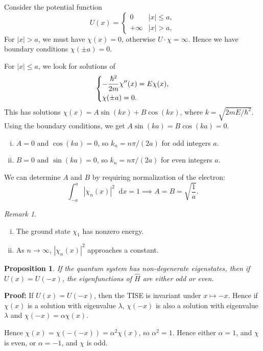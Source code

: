 \documentclass[12pt]{article}
\newcommand{\diff}{\mathop{}\!\mathrm{d}}
\newtheorem{proposition}{Proposition}[section]
\theoremstyle{definition}
\theoremstyle{remark}
\newtheorem*{remark}{Remark}
\begin{document}
Consider the potential function
\[
	U(x) =
	\begin{cases}
		0 & |x| \leq a, \\
		+\infty & |x| > a,
	\end{cases}
\]
For $|x| > a$, we must have $\chi(x) = 0$, otherwise $U \cdot \chi = \infty$. Hence we have boundary conditions $\chi(\pm a) = 0$.

For $|x| \leq a$, we look for solutions of
\[
\begin{dcases}
	- \frac{\hbar^2}{2m} \chi''(x) = E \chi(x), \\
	\chi(\pm a) = 0.
\end{dcases}
\]
This has solutions $\chi(x) = A \sin (k x) + B \cos (k x)$, where $k = \sqrt{2mE/\hbar^2}$. Using the boundary conditions, we get $A \sin (k a) = B \cos (k a) = 0$.
\begin{enumerate}[(i)]
	\item $A = 0$ and $\cos (k a) = 0$, so $k_n = n \pi/(2a)$ for odd integers $a$.
	\item $B = 0$ and $\sin (k a) = 0$, so $k_n = n \pi/(2a)$ for even integers $a$.
\end{enumerate}

We can determine $A$ and $B$ by requiring normalization of the electron:
\[
	\int_{-a}^{a} |\chi_n(x)|^2\diff x = 1 \implies A = B = \sqrt{\frac{1}{a}}
.\]
\begin{remark}
	\begin{enumerate}[(i)]
		\item The ground state $\chi_1$ has nonzero energy.
		\item As $n \to \infty$, $|\chi_n(x)|^2$ approaches a constant.
	\end{enumerate}
\end{remark}

\begin{proposition}
	If the quantum system has non-degenerate eigenstates, then if $U(x) = U(-x)$, the eigenfunctions of $\hat H$ are either odd or even.
\end{proposition}

\begin{adjustbox}{minipage = \columnwidth - 25.5pt, margin=1em, frame=1pt, margin=0em}
	\textbf{Proof:} If $U(x) = U(-x)$, then the TISE is invariant under $x \mapsto -x$. Hence if $\chi(x)$ is a solution with eigenvalue $\lambda$, $\chi(-x)$ is also a solution with eigenvalue $\lambda$ and $\chi(-x) = \alpha \chi(x)$.

	Hence $\chi(x) = \chi(-(-x)) = \alpha^2 \chi(x)$, so $\alpha^2 = 1$. Hence either $\alpha = 1$, and $\chi$ is even, or $\alpha = -1$, and $\chi$ is odd.
\end{adjustbox}
\end{document}
